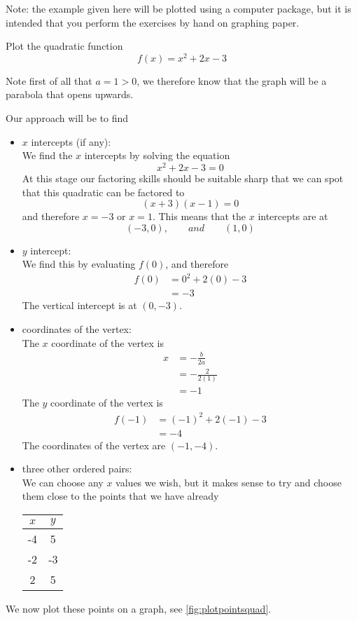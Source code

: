 Note: the example given here will be plotted using a computer package, but it is intended that you perform
the exercises {by hand on graphing paper}.

\begin{myexample}
Plot the quadratic function
\[
	f(x) = x^2+2x-3
\]
{}
\end{myexample}
\begin{myProof}
	Note first of all that $a=1>0$, we therefore know that the graph will be a parabola that opens
	upwards.
			
	Our approach will be to find
	\begin{itemize}
		\item $x$ intercepts (if any):\\
		We find the $x$ intercepts by solving the equation
		\[
			x^2+2x-3=0
		\]
		At this stage our factoring skills should be suitable sharp that we can spot that this quadratic
		can be factored to
		\[
			(x+3)(x-1)=0
		\]
		and therefore $x=-3$ or $x=1$. This means that the $x$ intercepts are at 
		\[
			(-3,0), \qquad and \qquad (1,0)
		\]
		\item $y$ intercept:\\
		We find this by evaluating $f(0)$, and therefore
		\begin{align*}
			f(0) & =  0^2+2(0)-3 \\
			     & =  -3         
		\end{align*} 
		The vertical intercept is at $(0,-3)$.
		\item coordinates of the vertex:\\
		The $x$ coordinate of the vertex is
		\begin{align*}
			x & =  - \frac{b}{2a}   \\
			  & =  - \frac{2}{2(1)} \\
			  & =  - 1              
		\end{align*} 
		The $y$ coordinate of the vertex is 
		\begin{align*}
			f(-1) & =  (-1)^2+2(-1)-3 \\
			      & =  -4             
		\end{align*} 
		The coordinates of the vertex are $(-1,-4)$.
		\item three other ordered pairs:\\
		We can choose any $x$ values we wish, but it makes sense to try and choose them close to the points that 
		we have already
		\begin{center}
			\begin{tabular}{SS}
				\toprule
				{$x$} & {$y$} \\
				    & 5     \\
				-2    & -3    \\
				2     & 5     \\
				\bottomrule
			\end{tabular} 
		\end{center}
	\end{itemize}
	We now plot these points on a graph, see \cref{fig:plotpointsquad}.
			

\end{myProof}
